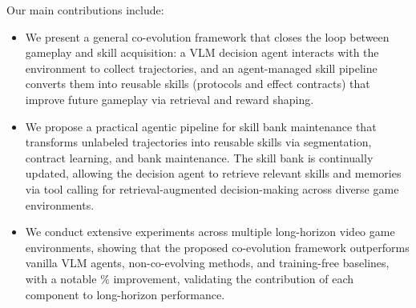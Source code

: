 Our main contributions include:
\begin{itemize}
    \item We present a general co-evolution framework that closes the loop between gameplay and skill acquisition: a VLM decision agent interacts with the environment to collect trajectories, and an agent-managed skill pipeline converts them into reusable skills (protocols and effect contracts) that improve future gameplay via retrieval and reward shaping.
    \item We propose a practical agentic pipeline for skill bank maintenance that transforms unlabeled trajectories into reusable skills via segmentation, contract learning, and bank maintenance. The skill bank is continually updated, allowing the decision agent to retrieve relevant skills and memories via tool calling for retrieval-augmented decision-making across diverse game environments.
    \item We conduct extensive experiments across multiple long-horizon video game environments, showing that the proposed co-evolution framework outperforms vanilla VLM agents, non-co-evolving methods, and training-free baselines, with a notable \% improvement, validating the contribution of each component to long-horizon performance.
\end{itemize}
